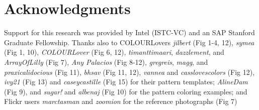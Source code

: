 \section*{Acknowledgments}

Support for this research was provided by Intel (ISTC-VC) and an SAP Stanford Graduate Fellowship.
Thanks also to COLOURLovers \textit{jilbert} (Fig 1-4, 12), \textit{symea} (Fig 1, 10), \textit{COLOURLover} (Fig 6, 12), \textit{timanttimaari}, \textit{dazzlement}, and \textit{ArrayOfLilly} (Fig 7), \textit{Any Palacios} (Fig 8-12), \textit{gregreis}, \textit{magg}, and \textit{praxicalidocious} (Fig 11), \textit{bhsav} (Fig 11, 12), \textit{vannea} and \textit{casslovescolors} (Fig 12), \textit{ivy21} (Fig 13) and \textit{caseycastille} (Fig 15) for their pattern templates; \textit{AlineDam} (Fig 9), and \textit{sugar!} and \textit{albenaj} (Fig 10) for the pattern coloring examples; and Flickr users \textit{marctasman} and \textit{zoomion} for the reference photographs (Fig 7)       

